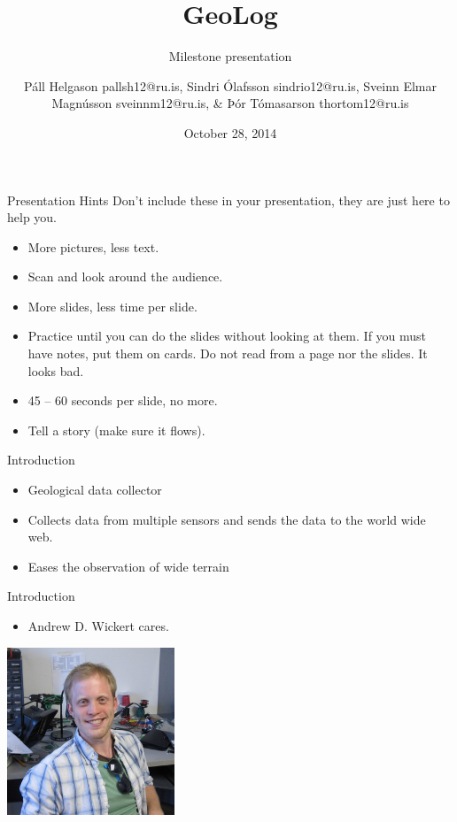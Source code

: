\documentclass{beamer}
\title{GeoLog}
\subtitle{Milestone presentation}
\author[P. Helgasson, S. Ólafsson, S. Magnússon, \& Þ. Tómasarson]{Páll Helgason pallsh12@ru.is, Sindri Ólafsson sindrio12@ru.is, Sveinn Elmar Magnússon sveinnm12@ru.is, \& Þór Tómasarson thortom12@ru.is}
\institute[RU]{
  Department of Science and Engineering (TVD) \\
  Reykjavík University \\
}
\date{October 28, 2014} %
\begin{document}
\begin{frame}[plain]
  \titlepage
\end{frame}

\begin{frame}{Presentation Hints}
Don't include these in your presentation, they are just here to help you.
\begin{itemize}
\item More pictures, less text.
\item Scan and look around the audience.
\item More slides, less time per slide.
\item Practice until you can do the slides without looking at them.
  If you must have notes, put them on cards.  Do not read from a page
  nor the slides.  It looks bad.
\item 45 -- 60 seconds per slide, no more.
\item Tell a story (make sure it flows).
\end{itemize}
\end{frame}

\begin{frame}{Introduction}
\begin{itemize}
\item Geological data collector
\item Collects data from multiple sensors and sends the data to the world wide web. 
\item Eases the observation of wide terrain
\end{itemize}
\end{frame}

\begin{frame}{Introduction}
\begin{itemize}
\item Andrew D. Wickert cares.
\end{itemize}
\centering
\includegraphics[height=5cm]{graphics/andrewWickert.png}
\cite{AffordableWS}
\end{frame}
\end{document}
